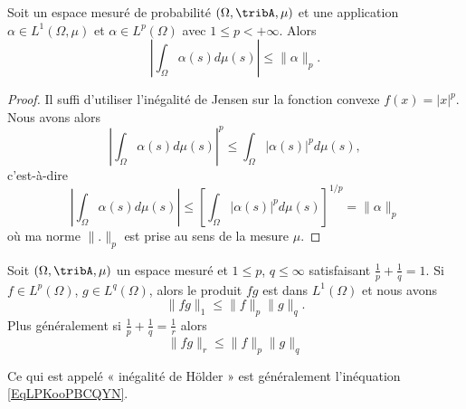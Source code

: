 \begin{corollary}
    Soit un espace mesuré de probabilité \( (\Omega,\tribA,\mu)\) et une application \( \alpha\in L^1(\Omega,\mu)\) et \( \alpha\in L^p(\Omega)\) avec \( 1\leq p<+\infty\). Alors
    \begin{equation}
        | \int_{\Omega}\alpha(s)d\mu(s) |\leq \| \alpha \|_p.
    \end{equation}
\end{corollary}

\begin{proof}
    Il suffi d'utiliser l'inégalité de Jensen sur la fonction convexe \( f(x)=| x |^p\). Nous avons alors
    \begin{equation}
        | \int_{\Omega}\alpha(s)d\mu(s) |^p\leq \int_{\Omega}| \alpha(s) |^pd\mu(s),
    \end{equation}
    c'est-à-dire
    \begin{equation}
        | \int_{\Omega}\alpha(s)d\mu(s) |\leq  \left[  \int_{\Omega}| \alpha(s) |^pd\mu(s)\right]^{1/p}=\| \alpha \|_p
    \end{equation}
    où ma norme \( \| . \|_p\) est prise au sens de la mesure \( \mu\).
\end{proof}

\begin{proposition}       \label{ProptYqspT}
    Soit \(  (\Omega,\tribA,\mu) \) un espace mesuré et \( 1\leq p\), \( q\leq\infty\) satisfaisant \( \frac{1}{ p }+\frac{1}{ q }=1\). Si \( f\in L^p(\Omega)\), \( g\in L^q(\Omega)\), alors le produit \( fg\) est dans \( L^1(\Omega)\) et nous avons
    \begin{equation}    \label{EqLPKooPBCQYN}
        \| fg \|_1\leq \| f \|_p\| g \|_q.
    \end{equation}
    Plus généralement si \( \frac{1}{ p }+\frac{1}{ q }=\frac{1}{ r }\) alors
    \begin{equation}    \label{EqAVZooFNyzmT}
        \| fg \|_r\leq \| f \|_p\| g \|_q
    \end{equation}
\end{proposition}
Ce qui est appelé « inégalité de Hölder » est généralement l'inéquation \eqref{EqLPKooPBCQYN}.

